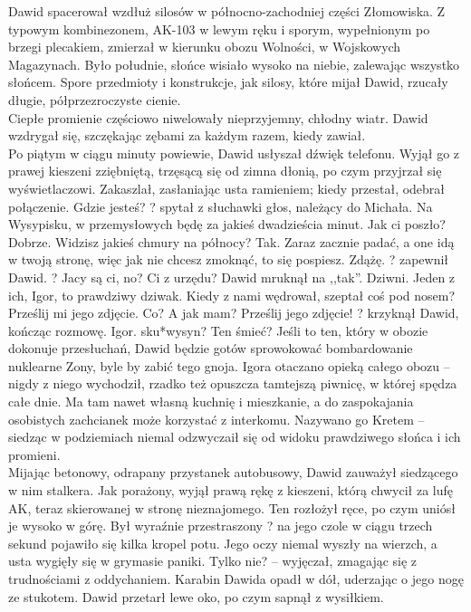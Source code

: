 \documentclass[../MAIN.tex]{subfiles}
\begin{document}
Dawid spacerował wzdłuż silosów w północno-zachodniej części Złomowiska. Z typowym kombinezonem, AK-103 w lewym ręku i sporym, wypełnionym po brzegi plecakiem, zmierzał w kierunku obozu Wolności, w Wojskowych Magazynach. Było południe, słońce wisiało wysoko na niebie, zalewając wszystko słońcem. Spore przedmioty i konstrukcje, jak silosy, które mijał Dawid, rzucały długie, półprzezroczyste cienie.\\
Ciepłe promienie częściowo niwelowały nieprzyjemny, chłodny wiatr. Dawid wzdrygał się, szczękając zębami za każdym razem, kiedy zawiał.\\
Po piątym w ciągu minuty powiewie, Dawid usłyszał dźwięk telefonu. Wyjął go z prawej kieszeni zziębniętą, trzęsącą się od zimna dłonią, po czym przyjrzał się wyświetlaczowi. Zakaszlał, zasłaniając usta ramieniem; kiedy przestał, odebrał połączenie.
\sx Gdzie jesteś? ? spytał z słuchawki głos, należący do Michała.
\xx Na Wysypisku, w przemysłowych będę za jakieś dwadzieścia minut. Jak ci poszło?
\xx Dobrze. Widzisz jakieś chmury na północy?
\xx Tak.
\xx Zaraz zacznie padać, a one idą w twoją stronę, więc jak nie chcesz zmoknąć, to się pospiesz.
\xx Zdążę. ? zapewnił Dawid. ? Jacy są ci, no?
\xx Ci z urzędu?
\qd
Dawid mruknął na ,,tak''.
\sx Dziwni. Jeden z ich, Igor, to prawdziwy dziwak. Kiedy z nami wędrował, szeptał coś pod nosem?
\xx Prześlij mi jego zdjęcie.
\xx Co? A jak mam?
\xx Prześlij jego zdjęcie! ? krzyknął Dawid, kończąc rozmowę. Igor. sku*wysyn? Ten śmieć? 
\qd
Jeśli to ten, który w obozie dokonuje przesłuchań, Dawid będzie gotów sprowokować bombardowanie nuklearne Zony, byle by zabić tego gnoja. Igora otaczano opieką całego obozu -- nigdy z niego wychodził, rzadko też opuszcza tamtejszą piwnicę, w której spędza całe dnie. Ma tam nawet własną kuchnię i mieszkanie, a do zaspokajania osobistych zachcianek może korzystać z interkomu. Nazywano go Kretem -- siedząc w podziemiach niemal odzwyczaił się od widoku prawdziwego słońca i ich promieni.\\
Mijając betonowy, odrapany przystanek autobusowy, Dawid zauważył siedzącego w nim stalkera.
Jak porażony, wyjął prawą rękę z kieszeni, którą chwycił za lufę AK, teraz skierowanej w stronę nieznajomego. Ten rozłożył ręce, po czym uniósł je wysoko w górę. Był wyraźnie przestraszony ? na jego czole w ciągu trzech sekund pojawiło się kilka kropel potu. Jego oczy niemal wyszły na wierzch, a usta wygięły się w grymasie paniki.
\sx Tylko nie? -- wyjęczał, zmagając się z trudnościami z oddychaniem.
\qd
Karabin Dawida opadł w dół, uderzając o jego nogę ze stukotem. Dawid przetarł lewe oko, po czym sapnął z wysiłkiem.
\end{document}
